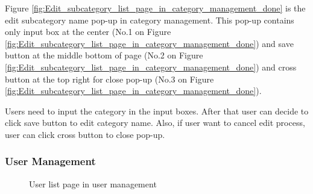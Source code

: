\documentclass[12pt,oneside,openright,a4paper]{cpe-english-project}
\begin{document}
		\begin{flushleft}
			Figure \ref*{fig:Edit_subcategory_list_page_in_category_management_done} is the edit subcategory name pop-up in category management. This pop-up contains only input box at the center (No.1 on Figure \ref*{fig:Edit_subcategory_list_page_in_category_management_done}) and save button at the middle bottom of page (No.2 on Figure \ref*{fig:Edit_subcategory_list_page_in_category_management_done}) and cross button at the top right for close pop-up (No.3 on Figure \ref*{fig:Edit_subcategory_list_page_in_category_management_done}).
		\end{flushleft}
		\begin{flushleft}
			Users need to input the category in the input boxes. After that user can decide to click save button to edit category name. Also, if user want to cancel edit process, user can click cross button to close pop-up.
		\end{flushleft}	
\subsubsection{User Management} 
	\begin{figure}[!h]\centering
		\caption{User list page in user management}\label{fig:ui_user_list_page_in_user_management_done}
	\end{figure}
\end{document}
